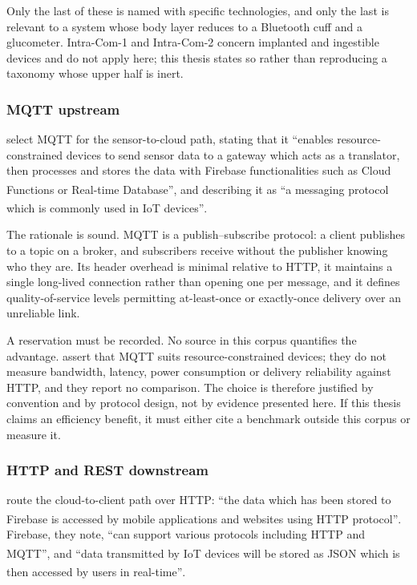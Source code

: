 \documentclass[12pt,a4paper,oneside]{report}
\newcommand{\bq}[1]{``#1''\textsuperscript{\dag}}
\begin{document}
Only the last of these is named with specific technologies, and only the last is relevant to a system whose body layer reduces to a Bluetooth cuff and a glucometer. Intra-Com-1 and Intra-Com-2 concern implanted and ingestible devices and do not apply here; this thesis states so rather than reproducing a taxonomy whose upper half is inert.

\subsubsection{MQTT upstream}

\Textcite{efendi2025} select MQTT for the sensor-to-cloud path, stating that it \bq{enables resource-constrained devices to send sensor data to a gateway which acts as a translator, then processes and stores the data with Firebase functionalities such as Cloud Functions or Real-time Database}, and describing it as \bq{a messaging protocol which is commonly used in IoT devices}.

The rationale is sound. MQTT is a publish--subscribe protocol: a client publishes to a topic on a broker, and subscribers receive without the publisher knowing who they are. Its header overhead is minimal relative to HTTP, it maintains a single long-lived connection rather than opening one per message, and it defines quality-of-service levels permitting at-least-once or exactly-once delivery over an unreliable link.

A reservation must be recorded. No source in this corpus quantifies the advantage. \Textcite{efendi2025} assert that MQTT suits resource-constrained devices; they do not measure bandwidth, latency, power consumption or delivery reliability against HTTP, and they report no comparison. The choice is therefore justified by convention and by protocol design, not by evidence presented here. If this thesis claims an efficiency benefit, it must either cite a benchmark outside this corpus or measure it.

\subsubsection{HTTP and REST downstream}

\Textcite{efendi2025} route the cloud-to-client path over HTTP: \bq{the data which has been stored to Firebase is accessed by mobile applications and websites using HTTP protocol}. Firebase, they note, \bq{can support various protocols including HTTP and MQTT}, and \bq{data transmitted by IoT devices will be stored as JSON which is then accessed by users in real-time}.
\end{document}
